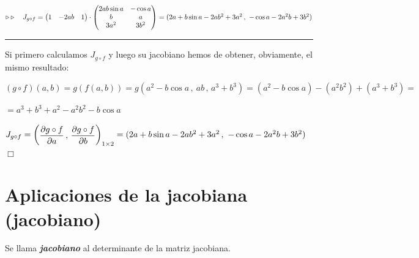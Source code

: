 $\triangleright \triangleright \quad J_{g\circ f} =\mqty(1& -2ab&1) \cdot \mqty(2ab\sin a & -\cos a \\ b&a\\3a^2&3b^2) = (2a+b\sin a-2ab^2+3a^2\, , \ -\cos a -2a^2b+3b^2)$

\rule{200pt}{0.1pt}

Si primero calculamos $J_{g\circ f}$ y luego su jacobiano hemos de obtener, obviamente,  el mismo resultado:


$(g\circ f)(a,b)=g(f(a,b))=g(a^2-b\cos a\, , \ ab\, , \, a^3+b^3) = (a^2-b\cos a)- (a^2b^2)+(a^3+b^3)= $

$=a^3+b^3+a^2-a^2b^2-b\cos a$


$J_{g\circ f}  = \mqty( \displaystyle \pdv{g\circ f}{a} \, , \,  \displaystyle \pdv{g\circ f}{b} )_{1\times 2} = (2a+b\sin a-2ab^2+3a^2\, , \ -\cos a -2a^2b+3b^2)$ \hspace{3cm} $\Box$



\section{Aplicaciones de la jacobiana (jacobiano)}

Se llama \textbf{\emph{jacobiano}} al determinante de la matriz jacobiana.

